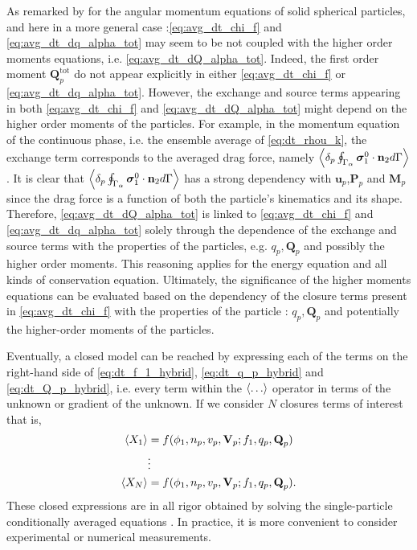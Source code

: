 As remarked by \citet{jackson1997locally} for the angular momentum equations of solid spherical particles, and here in a more general case :\ref{eq:avg_dt_chi_f} and \ref{eq:avg_dt_dq_alpha_tot} may seem to be not coupled with the higher order moments equations, i.e. \ref{eq:avg_dt_dQ_alpha_tot}. 
Indeed, the first order moment $\textbf{Q}_p^\text{tot}$ do not appear explicitly in either \ref{eq:avg_dt_chi_f} or \ref{eq:avg_dt_dq_alpha_tot}.
However, the exchange and source terms 
appearing in both \ref{eq:avg_dt_chi_f} and \ref{eq:avg_dt_dQ_alpha_tot} might depend on the higher order moments of the particles.
For example, in the momentum equation of the continuous phase, i.e. the ensemble average of \ref{eq:dt_rhou_k}, the exchange term corresponds to the averaged drag force, namely $\left<\delta_p \oint_{\Gamma_{\alpha}} \bm{\sigma}_1^0\cdot \textbf{n}_2 d\Gamma\right>$. 
It is clear that $\left<\delta_p \oint_{\Gamma_{\alpha}} \bm{\sigma}_1^0\cdot \textbf{n}_2 d\Gamma\right>$ has a strong dependency with $\textbf{u}_p$,$\textbf{P}_p$ and $\textbf{M}_p$ since the drag force is a function of both the particle's kinematics   and its shape. 
Therefore, \ref{eq:avg_dt_dQ_alpha_tot} is linked to \ref{eq:avg_dt_chi_f} and \ref{eq:avg_dt_dq_alpha_tot} solely through the dependence of the exchange and source terms with the properties of the particles, e.g. $q_p,\textbf{Q}_p$ and possibly the higher order moments. 
This reasoning applies for the energy equation and all kinds of conservation equation. 
Ultimately, the significance of the higher moments equations can be evaluated based on the dependency of the closure terms present in \ref{eq:avg_dt_chi_f} with the properties of the particle : $q_p, \textbf{Q}_p$ and potentially the higher-order moments of the particles.


Eventually, a closed model can be reached by expressing each of the terms on the right-hand side of \ref{eq:dt_f_1_hybrid}, \ref{eq:dt_q_p_hybrid} and \ref{eq:dt_Q_p_hybrid}, i.e. every term within the $\left<\ldots\right>$ operator in terms of the unknown or gradient of the unknown.
If we consider $N$ closures terms of interest that is, 
\begin{align*}
    \left<X_1\right> &=  f(\phi_1,n_p,v_p,\textbf{V}_p; f_1,q_p,\textbf{Q}_p)\\
    &\vdots\\
    \left<X_N\right> &=  f(\phi_1,n_p,v_p,\textbf{V}_p; f_1,q_p,\textbf{Q}_p). \\
\end{align*}
These closed expressions are in all rigor obtained by solving the single-particle conditionally averaged equations \citet{hinch1977averaged,zhang1994ensemble}.
In practice, it is more convenient to consider experimental or numerical measurements.  

